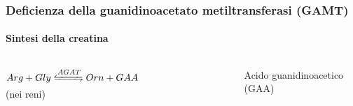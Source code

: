 \begin{frame}
\frametitle {Deficienza della guanidinoacetato metiltransferasi (GAMT)}
\framesubtitle {Sintesi della creatina}
\begin{columns}
	$Arg + Gly \xleftrightharpoons{AGAT} Orn + GAA$ (nei reni)
	\begin{figure}
	\end{figure}
	\centering Acido guanidinoacetico (GAA)
\end{columns}

\end{frame}

